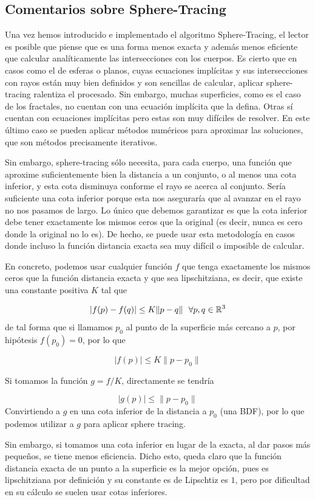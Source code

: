 \subsection{Comentarios sobre Sphere-Tracing}
\label{subsection:comentarios}

Una vez hemos introducido e implementado el algoritmo Sphere-Tracing, el lector es posible que piense que es una forma menos exacta y además menos eficiente que calcular analíticamente las intersecciones con los cuerpos. Es cierto que en casos como el de esferas o planos, cuyas ecuaciones implícitas y sus intersecciones con rayos están muy bien definidos y son sencillas de calcular, aplicar sphere-tracing ralentiza el procesado. Sin embargo, muchas superficies, como es el caso de los fractales, no cuentan con una ecuación implícita que la defina. Otras sí cuentan con ecuaciones implícitas pero estas son muy difíciles de resolver. En este último caso se pueden aplicar métodos numéricos para aproximar las soluciones, que son métodos precisamente iterativos. 

Sin embargo, sphere-tracing sólo necesita, para cada cuerpo, una función que aproxime suficientemente bien la distancia a un conjunto, o al menos una cota inferior, y esta cota disminuya conforme el rayo se acerca al conjunto. Sería suficiente una cota inferior porque esta nos aseguraría que al avanzar en el rayo no nos pasamos de largo. Lo único que debemos garantizar es que la cota inferior debe tener exactamente los mismos ceros que la original (es decir, nunca es cero donde la original no lo es). De hecho, se puede usar esta metodología en casos donde incluso la función distancia exacta sea muy difícil o imposible de calcular.

En concreto, podemos usar cualquier función $f$ que tenga exactamente los mismos ceros que la función distancia exacta y que sea lipschitziana, es decir, que existe una constante positiva $K$ tal que

$$
|f(p)-f(q)|\leq K \|p-q\| \ \ \forall p,q\in\mathbb{R}^3 
$$
de tal forma que si llamamos $p_0$ al punto de la superficie más cercano a $p$, por hipótesis $f(p_0)=0$, por lo que

$$
|f(p)|\leq K \| p-p_0\|
$$

Si tomamos la función $g=f/K$, directamente se tendría 

$$
|g(p)|\leq\|p-p_0\|
$$
Convirtiendo a $g$ en una cota inferior de la distancia a $p_0$ (una BDF), por lo que podemos utilizar a $g$ para aplicar sphere tracing.

Sin embargo, si tomamos una cota inferior en lugar de la exacta, al dar pasos más pequeños, se tiene menos eficiencia. Dicho esto, queda claro que la función distancia exacta de un punto a la superficie es la mejor opción, pues es lipschitziana por definición y su constante es de Lipschtiz es $1$, pero por dificultad en su cálculo se suelen usar cotas inferiores.

